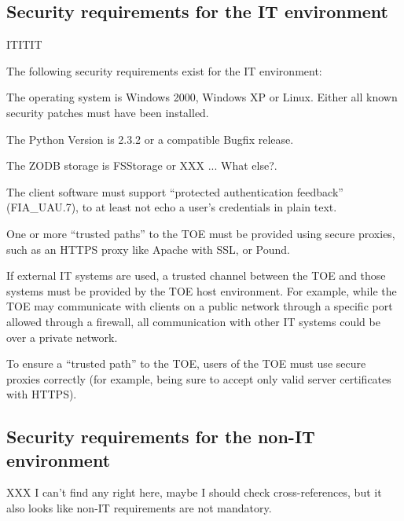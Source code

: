 \documentclass[10pt,a4paper,english]{article}
\begin{document}
\subsection*{Security requirements for the IT environment}

ITITIT

The following security requirements exist for the IT environment:

The operating system is Windows 2000, Windows XP or Linux. Either all
known security patches must have been installed.

The Python Version is 2.3.2 or a compatible Bugfix release.

The ZODB storage is FSStorage or XXX ... What else?.

The client software must support ``protected authentication feedback''
(FIA{\_}UAU.7), to at least not echo a user's credentials in plain text.

One or more ``trusted paths'' to the TOE must be provided using secure
proxies, such as an HTTPS proxy like Apache with SSL, or Pound.

If external IT systems are used, a trusted channel between the TOE and
those systems must be provided by the TOE host environment.  For
example, while the TOE may communicate with clients on a public
network through a specific port allowed through a firewall, all
communication with other IT systems could be over a private network.

To ensure a ``trusted path'' to the TOE, users of the TOE must use
secure proxies correctly (for example, being sure to accept only
valid server certificates with HTTPS).



\hypertarget{security-requirements-for-the-non-it-environment}{}
\subsection*{Security requirements for the non-IT environment}

XXX I can't find any right here, maybe I should check cross-references, but it
also looks like non-IT requirements are not mandatory.



\hypertarget{toe-summary-specification}{}
\end{document}
